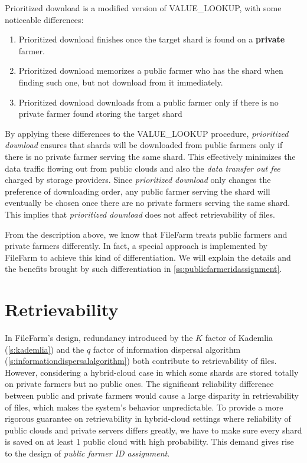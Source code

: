 Prioritized download is a modified version of VALUE\_LOOKUP, with some noticeable differences:

\begin{enumerate}
  \item Prioritized download finishes once the target shard is found on a \textbf{private} farmer.
  \item Prioritized download memorizes a public farmer who has the shard when finding such one, but not download from it immediately.
  \item Prioritized download downloads from a public farmer only if there is no private farmer found storing the target shard
\end{enumerate}

By applying these differences to the VALUE\_LOOKUP procedure, \textit{prioritized download} ensures that shards will be downloaded from public farmers only if there is no private farmer serving the same shard. This effectively minimizes the data traffic flowing out from public clouds and also the \textit{data transfer out fee} charged by storage providers. Since \textit{prioritized download} only changes the preference of downloading order, any public farmer serving the shard will eventually be chosen once there are no private farmers serving the same shard. This implies that \textit{prioritized download} does not affect retrievability of files.

From the description above, we know that FileFarm treats public farmers and private farmers differently. In fact, a special approach is implemented by FileFarm to achieve this kind of differentiation. We will explain the details and the benefits brought by such differentiation in \ref{ss:publicfarmeridassignment}.

\section{Retrievability}
\label{s:retrievability}

In FileFarm's design, redundancy introduced by the $K$ factor of Kademlia (\ref{s:kademlia}) and the $q$ factor of information dispersal algorithm (\ref{s:informationdispersalalgorithm}) both contribute to retrievability of files. However, considering a hybrid-cloud case in which some shards are stored totally on private farmers but no public ones. The significant reliability difference between public and private farmers would cause a large disparity in retrievability of files, which makes the system's behavior unpredictable. To provide a more rigorous guarantee on retrievability in hybrid-cloud settings where reliability of public clouds and private servers differs greatly, we have to make sure every shard is saved on at least 1 public cloud with high probability. This demand gives rise to the design of \textit{public farmer ID assignment}.

